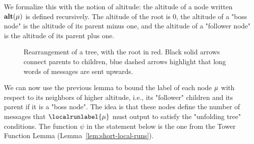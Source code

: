 We formalize this with the notion of altitude: the altitude of a node written  $\mathbf{alt}(\mu)$ is defined recursively. The altitude of the root is 0, the altitude of a "boss node" is the altitude of its parent minus one, and the altitude of a "follower node" is the altitude of its parent plus one.


\begin{figure}[h]
	\resizebox*{!}{3cm}{
	
	}
	\caption{Rearrangement of a tree, with the root in red. Black solid arrows connect parents to children, blue dashed arrows highlight that long words of messages are sent upwards.}
	\label{fig:rearrange-tree}
\end{figure}


We can now use the previous lemma to bound the label of each node $\mu$ with respect to its neighbors of higher altitude, i.e., its "follower" children and its parent if it is a "boss node". The idea is that these nodes define the number of messages that $\localrunlabel{\node}$ must output to satisfy the "unfolding tree" conditions. The function $\psi$ in the statement below is the one from the Tower Function Lemma (Lemma~\ref{lem:short-local-runs}).

